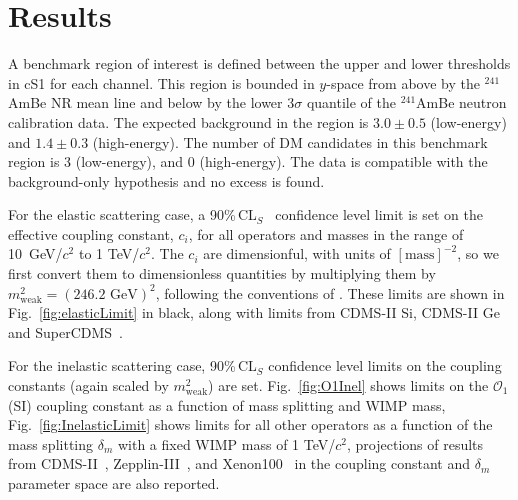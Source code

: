\section{Results}
\label{sec:Results}

A benchmark region of interest is defined between the upper and lower thresholds in cS1 for each channel. This region
is bounded in $y$-space from above by the $^{241}$AmBe NR mean line and below by the lower 3$\sigma$ quantile of the $^{241}$AmBe neutron calibration data. The expected background in the region is $3.0 \pm 0.5$ (low-energy) and $1.4 \pm 0.3$ (high-energy). The number of DM candidates in this benchmark region is 3 (low-energy), and 0 (high-energy). The data is compatible with the background-only hypothesis and no excess is found. 

For the elastic scattering case, a 90\%\,CL$_S$~\cite{cls} confidence level limit is set on the effective coupling constant, $c_i$,  for all operators and masses in the range of 10~GeV/$c^2$ to 1 TeV/$c^2$. The $c_i$ are dimensionful, with units of $[\mathrm{mass}]^{-2}$, so we first convert them to dimensionless quantities by multiplying them by $m_\mathrm{weak}^2=(246.2\text{ GeV})^2$, following the conventions of \cite{Anand:MathTools}. 
These limits are shown in Fig.~\ref{fig:elasticLimit} in black, along with limits from CDMS-II Si, CDMS-II Ge and SuperCDMS~\cite{CDMSEFT}.  


For the inelastic scattering case,  90\%\,CL$_S$ confidence level limits on the coupling constants 
(again scaled by $m_\mathrm{weak}^2$) are set. Fig.~\ref{fig:O1Inel} shows limits on the $\mathcal{O}_1$ (SI) coupling constant as a function of mass splitting and WIMP mass, Fig.~\ref{fig:InelasticLimit} shows limits for all other operators as a function of the mass splitting $\delta_m$ with a fixed WIMP mass of 1 TeV/$c^2$,  
projections of results from CDMS-II~\cite{CDMS_Inelastic}, Zepplin-III~\cite{Zepplin_Inel}, and Xenon100~\cite{XENON_Inelastic_WIMP} in the coupling constant and $\delta_m$ parameter space are also reported.
  


